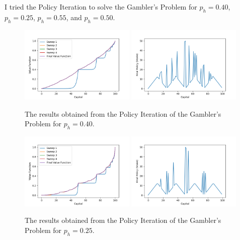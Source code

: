 I tried the Policy Iteration to solve the Gambler's Problem for $p_h=0.40$, $p_h=0.25$, $p_h=0.55$, and $p_h=0.50$. 

\begin{figure}[h!]
    \centering
    \includegraphics[width=0.49\textwidth]{images/sweeps-0.4.png}
    \includegraphics[width=0.49\textwidth]{images/pi-0.4.png}
    \caption{The results obtained from the Policy Iteration of the Gambler's Problem for $p_h=0.40$.}
    \label{fig:gambler-0.40}
\end{figure}

\begin{figure}[h!]
    \centering
    \includegraphics[width=0.49\textwidth]{images/sweeps-0.25.png}
    \includegraphics[width=0.49\textwidth]{images/pi-0.25.png}
    \caption{The results obtained from the Policy Iteration of the Gambler's Problem for $p_h=0.25$.}
    \label{fig:gambler-0.25}
\end{figure}

